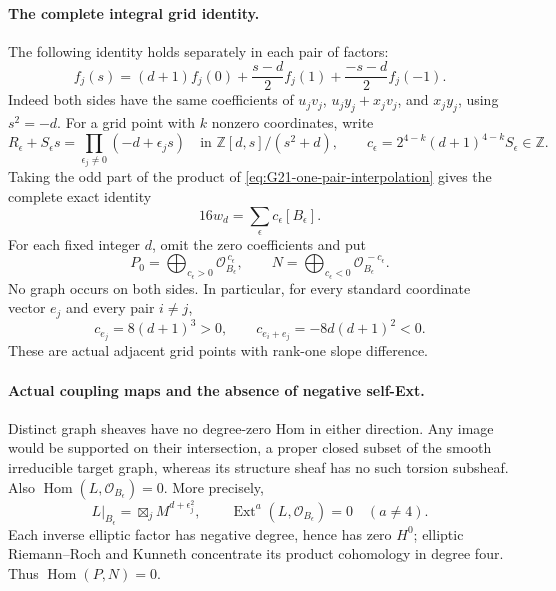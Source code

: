 \paragraph{The complete integral grid identity.}
The following identity holds separately in each pair of factors:
\begin{equation}\label{eq:G21-one-pair-interpolation}
 f_j(s)=(d+1)f_j(0)+\frac{s-d}{2}f_j(1)
                              +\frac{-s-d}{2}f_j(-1).
\end{equation}
Indeed both sides have the same coefficients of
\(u_jv_j\), \(u_jy_j+x_jv_j\), and \(x_jy_j\), using \(s^2=-d\).
For a grid point with \(k\) nonzero coordinates, write
\[
 R_\epsilon+S_\epsilon s
       =\prod_{\epsilon_j\ne0}(-d+\epsilon_js)
                 \quad\text{in }\mathbb Z[d,s]/(s^2+d),
 \qquad
 c_\epsilon=2^{4-k}(d+1)^{4-k}S_\epsilon\in\mathbb Z.
\]
Taking the odd part of the product of
\eqref{eq:G21-one-pair-interpolation} gives the complete exact identity
\begin{equation}\label{eq:G21-grid-identity}
                     16w_d=\sum_\epsilon c_\epsilon[B_\epsilon].
\end{equation}
For each fixed integer \(d\), omit the zero coefficients and put
\[
 P_0=\bigoplus_{c_\epsilon>0}
          \mathcal O_{B_\epsilon}^{\,c_\epsilon},\qquad
 N=\bigoplus_{c_\epsilon<0}
          \mathcal O_{B_\epsilon}^{\,-c_\epsilon}.
\]
No graph occurs on both sides. In particular, for every standard
coordinate vector \(e_j\) and every pair \(i\ne j\),
\begin{equation}\label{eq:G21-important-coefficients}
 c_{e_j}=8(d+1)^3>0,
 \qquad c_{e_i+e_j}=-8d(d+1)^2<0.
\end{equation}
These are actual adjacent grid points with rank-one slope difference.

\paragraph{Actual coupling maps and the absence of negative self-Ext.}
Distinct graph sheaves have no degree-zero Hom in either direction.
Any image would be supported on their intersection, a proper closed
subset of the smooth irreducible target graph, whereas its structure
sheaf has no such torsion subsheaf. Also
\(\operatorname{Hom}(L,\mathcal O_{B_\epsilon})=0\). More precisely,
\[
 L|_{B_\epsilon}=\boxtimes_j M^{d+\epsilon_j^2},\qquad
 \operatorname{Ext}^a(L,\mathcal O_{B_\epsilon})=0\quad(a\ne4).
\]
Each inverse elliptic factor has negative degree, hence has zero
\(H^0\); elliptic Riemann--Roch and Kunneth concentrate its product
cohomology in degree four. Thus \(\operatorname{Hom}(P,N)=0\).

